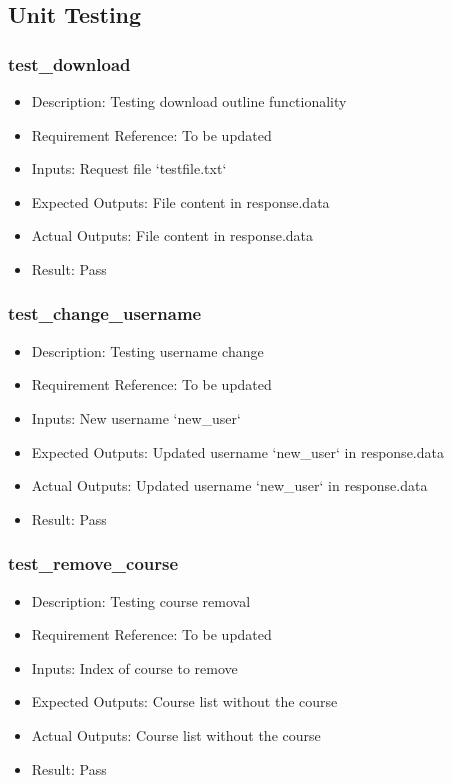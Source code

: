 \documentclass[12pt, titlepage]{article}
\begin{document}
\subsection{Unit Testing}
\subsubsection{test\_download}\label{3.1.1}
\begin{itemize}
    \item Description: Testing download outline functionality
    \item Requirement Reference: To be updated
    \item Inputs: Request file `testfile.txt` 
    \item Expected Outputs: File content in response.data  
    \item Actual Outputs: File content in response.data  
    \item Result: Pass
\end{itemize}
\subsubsection{test\_change\_username}\label{3.1.2}
\begin{itemize}
    \item Description: Testing username change
    \item Requirement Reference: To be updated
    \item Inputs: New username `new\_user`
    \item Expected Outputs: Updated username `new\_user` in response.data
    \item Actual Outputs: Updated username `new\_user` in response.data
    \item Result: Pass
\end{itemize}
\subsubsection{test\_remove\_course}\label{3.1.3}
\begin{itemize}
    \item Description: Testing course removal
    \item Requirement Reference: To be updated
    \item Inputs: Index of course to remove
    \item Expected Outputs: Course list without the course
    \item Actual Outputs: Course list without the course
    \item Result: Pass
\end{itemize}
\end{document}
